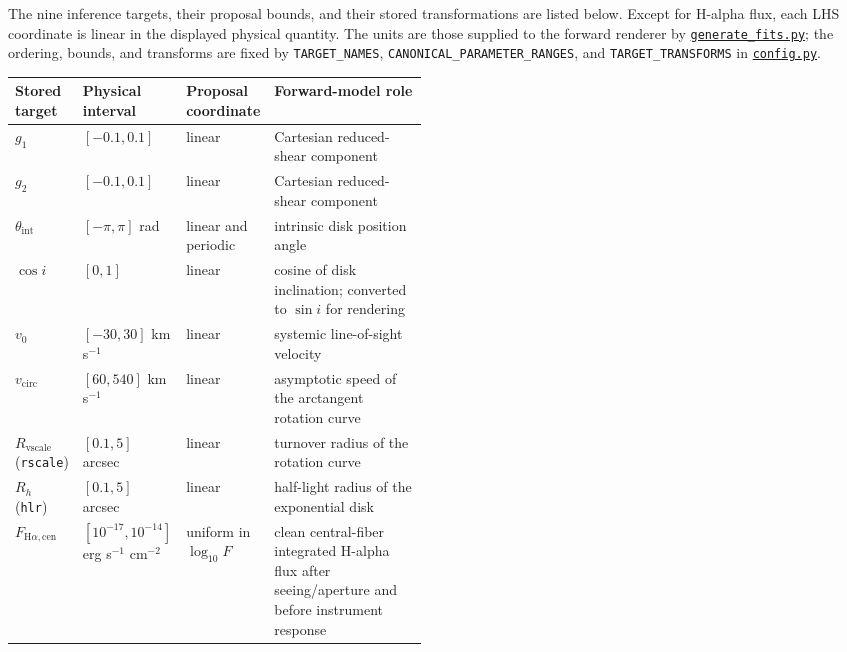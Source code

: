 \documentclass[11pt]{article}
\newcommand{\code}[1]{\nolinkurl{#1}}
\begin{document}
The nine inference targets, their proposal bounds, and their stored
transformations are listed below. Except for H-alpha flux, each LHS coordinate
is linear in the displayed physical quantity. The units are those supplied to
the forward renderer by \href{../data_generate/generate_fits.py}{\code{generate_fits.py}};
the ordering, bounds, and transforms are fixed by \code{TARGET_NAMES},
\code{CANONICAL_PARAMETER_RANGES}, and \code{TARGET_TRANSFORMS} in
\href{../arch/config.py}{\code{config.py}}.

\begin{center}
\small
\begin{tabularx}{\linewidth}{@{}>{\RaggedRight\arraybackslash}p{0.13\linewidth} >{\RaggedRight\arraybackslash}p{0.17\linewidth} >{\RaggedRight\arraybackslash}p{0.18\linewidth} >{\RaggedRight\arraybackslash}X@{}}
\toprule
\textbf{Stored target} & \textbf{Physical interval} & \textbf{Proposal coordinate} & \textbf{Forward-model role} \\
\midrule
\(g_1\) & \([-0.1,0.1]\) & linear & Cartesian reduced-shear component \\
\(g_2\) & \([-0.1,0.1]\) & linear & Cartesian reduced-shear component \\
\(\theta_\mathrm{int}\) & \([-\pi,\pi]\) rad & linear and periodic & intrinsic disk position angle \\
\(\cos i\) & \([0,1]\) & linear & cosine of disk inclination; converted to \(\sin i\) for rendering \\
\(v_0\) & \([-30,30]\) km s\(^{-1}\) & linear & systemic line-of-sight velocity \\
\(v_\mathrm{circ}\) & \([60,540]\) km s\(^{-1}\) & linear & asymptotic speed of the arctangent rotation curve \\
\(R_\mathrm{vscale}\) (\code{rscale}) & \([0.1,5]\) arcsec & linear & turnover radius of the rotation curve \\
\(R_h\) (\code{hlr}) & \([0.1,5]\) arcsec & linear & half-light radius of the exponential disk \\
\(F_{\mathrm{H}\alpha,\mathrm{cen}}\) & \([10^{-17},10^{-14}]\) erg s\(^{-1}\) cm\(^{-2}\) & uniform in \(\log_{10}F\) & clean central-fiber integrated H-alpha flux after seeing/aperture and before instrument response \\
\bottomrule
\end{tabularx}
\end{center}
\end{document}
